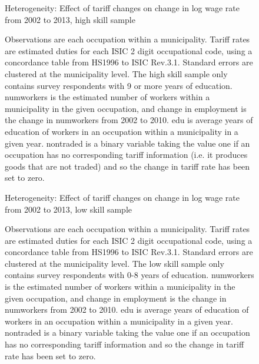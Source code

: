 \begin{landscape}
\begin{figure}[H]
\begin{center}
Heterogeneity: Effect of tariff changes on change in log wage rate from 2002 to 2013, high skill sample

\caption{\label{fig:Table4}}
\end{center}
\small{Observations are each occupation within a municipality.
Tariff rates are estimated duties for each ISIC 2 digit occupational code,
using a concordance table from HS1996 to ISIC Rev.3.1. Standard errors are clustered at the 
municipality level. The high skill sample only 
contains survey respondents with 9 or more years of education. numworkers is the estimated
number of workers within a municipality in the given occupation, and change in employment
is the change in numworkers from 2002 to 2010. edu is average years of education 
of workers in an occupation within a municipality in a given year. nontraded is a binary variable
taking the value one if an occupation has no corresponding tariff information (i.e. it produces goods
that are not traded) and so the change in
tariff rate has been set to zero.}
\end{figure}

\begin{figure}[H]
\begin{center}
Heterogeneity: Effect of tariff changes on change in log wage rate from 2002 to 2013, low skill sample

\caption{\label{fig:Table5}}
\end{center}
\small{Observations are each occupation within a municipality. 
Tariff rates are estimated duties for each ISIC 2 digit occupational code,
using a concordance table from HS1996 to ISIC Rev.3.1. Standard errors are clustered at the 
municipality level. The low skill sample only 
contains survey respondents with 0-8 years of education. numworkers is the estimated
number of workers within a municipality in the given occupation, and change in employment
is the change in numworkers from 2002 to 2010. edu is average years of education 
of workers in an occupation within a municipality in a given year. nontraded is a binary variable
taking the value one if an occupation has no corresponding tariff information and so the change in
tariff rate has been set to zero.}
\end{figure}
\end{landscape}